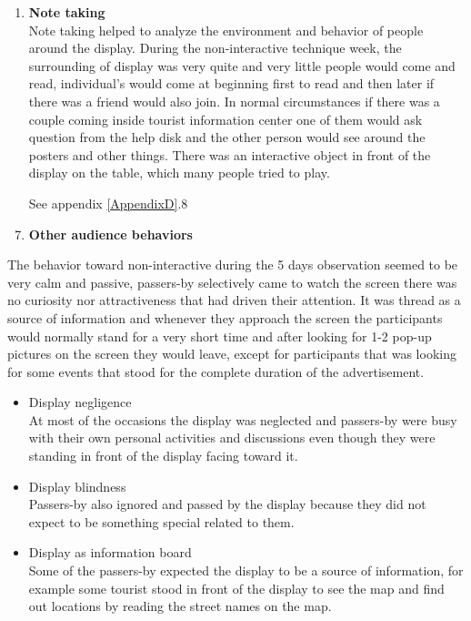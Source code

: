 \begin{enumerate}
\item \textbf{Note taking} \\
Note taking helped to analyze the environment and behavior of people around the display.
During the non-interactive technique week, the surrounding of display was very quite and very little people would come and read, individual’s would come at beginning first to read and then later if there was a friend would also join. In normal circumstances if there was a couple coming inside tourist information center one of them would ask question from the help disk and the other person would see around the posters and other things.  There was an interactive object in front of the display on the table, which many people tried to play.

See appendix  \ref{AppendixD}.8

\end{enumerate}

\newpage
\begin{enumerate}
\setcounter{enumi}{6}
\item \textbf{Other audience behaviors}
\end{enumerate}

The behavior toward non-interactive during the 5 days observation seemed to be very calm and passive, passers-by selectively came to watch the screen there was no curiosity nor attractiveness that had driven their attention. It was thread as a source of information and whenever they approach the screen the participants would normally stand for a very short time and after looking for 1-2 pop-up pictures on the screen they would leave, except for participants that was looking for some events that stood for the complete duration of the advertisement. 

\begin{itemize}

\item Display negligence  \\
At most of the occasions the display was neglected and passers-by were busy with their own personal activities and discussions even though they were standing in front of the display facing toward it.

\item Display blindness \\
Passers-by also ignored and passed by the display because they did not expect to be something special related to them.

\item Display as information board \\
Some of the passers-by expected the display to be a source of information, for example some tourist stood in front of the display to see the map and find out locations by reading the street names on the map.

\end{itemize}


